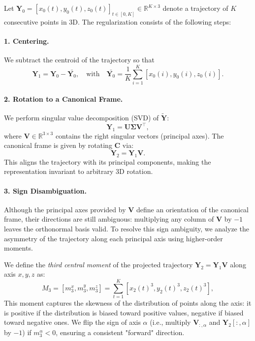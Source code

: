 Let $\mathbf{Y}_0 = [x_0(t),y_0(t),z_0(t)]_{t\in[0,K]} \in \mathbb{R}^{K \times 3}$ denote a trajectory of $K$ consecutive points in 3D. The regularization consists of the following steps:

\paragraph{1. Centering.} We subtract the centroid of the trajectory so that
\[
\mathbf{Y}_1 = \mathbf{Y}_0 - \bar{\mathbf{Y}_0}, \quad \text{with} \quad \bar{\mathbf{Y}_0} = \frac{1}{K} \sum_{i=1}^{K} [x_0(i),y_0(i),z_0(i)].
\]

\paragraph{2. Rotation to a Canonical Frame.} We perform singular value decomposition (SVD) of $\mathbf{\tilde{Y}}$:
\[
\mathbf{Y}_1 = \mathbf{U} \boldsymbol{\Sigma} \mathbf{V}^\top,
\]
where $\mathbf{V} \in \mathbb{R}^{3 \times 3}$ contains the right singular vectors (principal axes). The canonical frame is given by rotating $\mathbf{C}$ via:
\[
\mathbf{Y}_2 = \mathbf{Y}_1 \mathbf{V}.
\]
This aligns the trajectory with its principal components, making the representation invariant to arbitrary 3D rotation.

\paragraph{3. Sign Disambiguation.}  
Although the principal axes provided by $\mathbf{V}$ define an orientation of the canonical frame, their directions are still ambiguous: multiplying any column of $\mathbf{V}$ by $-1$ leaves the orthonormal basis valid. To resolve this sign ambiguity, we analyze the asymmetry of the trajectory along each principal axis using higher-order moments.

We define the \emph{third central moment} of the projected trajectory $\mathbf{Y}_2 = \mathbf{Y}_1 \mathbf{V}$ along axis $x,y,z$ as:%
\[
M_3 = [m_3^x,m_3^y,m_3^z]  = \sum_{t=1}^{K} \left[ x_2(t)^3, y_2(t)^3, z_2(t)^3\right],
\]
This moment captures the skewness of the distribution of points along the axis: it is positive if the distribution is biased toward positive values, negative if biased toward negative ones. We flip the sign of axis $\alpha$ (i.e., multiply $\mathbf{V}_{:,\alpha}$ and $\mathbf{Y}_2[:,\alpha]$ by $-1$) if $m_3^{\alpha} < 0$, ensuring a consistent "forward" direction.

